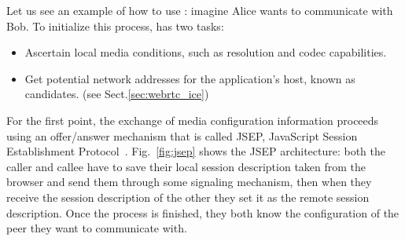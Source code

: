 Let us see an example of how to use \RTCPeerConnection: imagine Alice wants to communicate with Bob. To initialize this process, \RTCPeerConnection has two tasks:
\begin{itemize}
	\item Ascertain local media conditions, such as resolution and codec capabilities.
	\item Get potential network addresses for the application's host, known as candidates. (see Sect.\ref{sec:webrtc_ice})
\end{itemize}

For the first point, the exchange of media configuration information proceeds using an offer/answer mechanism that is called JSEP, JavaScript Session Establishment Protocol~\cite{jsep}. Fig.~\ref{fig:jsep} shows the JSEP architecture: both the caller and callee have to save their local session description taken from the browser and send them through some signaling mechanism, then when they receive the session description of the other they set it as the remote session description. Once the process is finished, they both know the configuration of the peer they want to communicate with.

